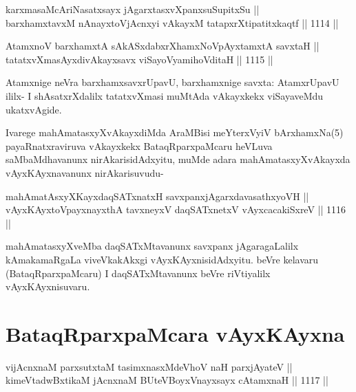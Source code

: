 \begin{shl}
karxmasaMcAriNasatxsayx jAgarxtasxvXpanxsuSupitxSu || \\
barxhamxtavxM nAnayxtoV\s jAcnxyi vAkayxM tatapxrXtipatitxkaqtf \hfill || 1114 ||  
\end{shl}


\begin{shl}
AtamxnoV barxhamxtA sAkASxdabxrXhamxNoV\s pAyxtamxtA savxtaH ||  \\
tatatxvXmasAyxdivAkayxsavx viSayoV\s yamihoVditaH \hfill || 1115 || 
\end{shl}

\begin{artha}
Atamxnige neVra barxhamxsavxrUpavU, barxhamxnige savxta: AtamxrUpavU ililx- I shAsatxrXdalilx tatatxvXmasi muMtAda vAkayxkekx viSayaveMdu ukatxvAgide.
\end{artha}

\begin{artha}
Ivarege mahAmatasxyXvAkayxdiMda AraMBisi meYterxVyiV bArxhamxNa(5) payaRnatxraviruva vAkayxkekx BataqRparxpaMcaru heVLuva saMbaMdhavanunx nirAkarisidAdxyitu, muMde adara mahAmatasxyXvAkayxda vAyxKAyxnavanunx nirAkarisuvudu-
\end{artha}

\begin{shl}
mahAmatAsxyXKayxdaqSATxnatxH savxpanxjAgarxdavasathxyoVH || \\
vAyxKAyxtoV\s payxnayxthA tavxneyxV daqSATxnetxV vAyxcacakiSxreV \hfill || 1116 ||  
\end{shl}

\begin{artha}
mahAmatasxyXveMba daqSATxMtavanunx savxpanx jAgaragaLalilx kAmakamaRgaLa viveVkakAkxgi vAyxKAyxnisidAdxyitu. beVre kelavaru (BataqRparxpaMcaru) I daqSATxMtavanunx beVre riVtiyalilx vAyxKAyxnisuvaru.
\end{artha}

\section*{BataqRparxpaMcara vAyxKAyxna}



\begin{shl}
vijAcnxnaM parxsutxtaM tasimxnasxMdeVhoV naH parxjAyateV || \\
kimeVtadwBxtikaM jAcnxnaM BUteVBoyxV\s nayxsayx cA\s \s tamxnaH \hfill || 1117 ||  
\end{shl}

